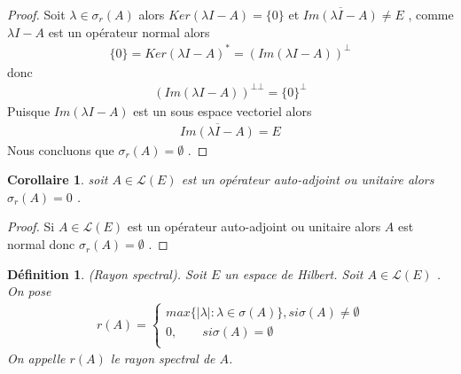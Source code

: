 \documentclass{report}
\newtheorem{Def}{Définition}[subsection]
\newtheorem{Cor}{Corollaire}[subsection]
\begin{document}
{\begin{proof}
 Soit $\lambda \in \sigma_r(A)$ alors $Ker(\lambda I - A) = \{0\}$ et $\overline{Im(\lambda I - A)} \neq E$ , comme $\lambda I - A$ est un opérateur normal alors 
					\begin{align*}
					 \{0\} = Ker(\lambda I - A)^* = (Im(\lambda I - A))^{\bot} 
					\end{align*}
	donc 
					\begin{align*}
					 (Im(\lambda I - A))^{\bot \bot} = \{0\}^{\bot} 
					\end{align*}
	Puisque $Im(\lambda I - A)$ est un sous espace vectoriel alors 
					\begin{align*}
					 \overline{Im(\lambda I - A)} = E 
					\end{align*}
	Nous concluons que $\sigma_r(A) = \emptyset$ .
\end{proof}


\begin{Cor} soit $A \in \mathscr{L}(E)$ est un opérateur auto-adjoint ou unitaire alors $\sigma_r(A) = 0$ . \\
\end{Cor}
\begin{proof}
Si $A \in \mathscr{L}(E)$ est un opérateur auto-adjoint ou unitaire alors $A$ est normal donc $\sigma_r(A) = \emptyset$ . 
\end{proof}


\begin{Def} (Rayon spectral). Soit $E$ un espace de Hilbert. Soit $A \in \mathscr{L}(E)$ . On pose 
					\begin{align*}
						 r(A) = \begin{cases}
										max\{|\lambda| : \lambda \in \sigma(A) \}, si \sigma(A) \neq \emptyset \\
										0, \quad \quad  si \sigma(A) = \emptyset \\
							   		  \end{cases} 
					\end{align*}
	On appelle $r(A)$ le rayon spectral de $A$.\\
\end{Def}




}
\end{document}
